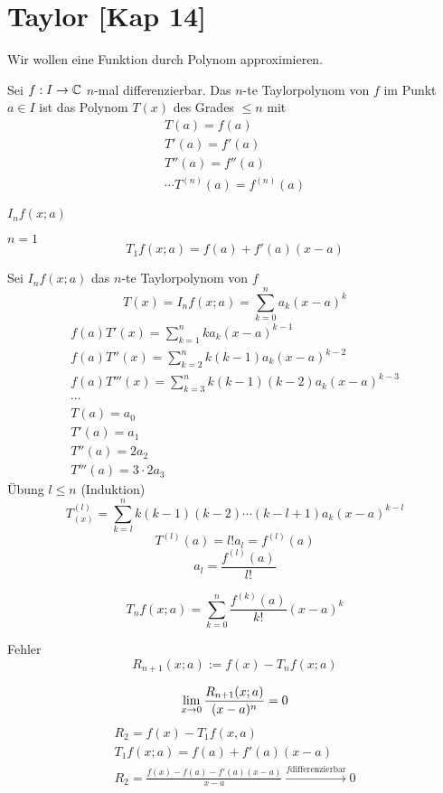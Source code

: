 \section{Taylor [Kap 14]}
Wir wollen eine Funktion durch Polynom approximieren.
\begin{Def}
  Sei $f:I\to\mathbb{C}$ $n$-mal differenzierbar. Das $n$-te Taylorpolynom von $f$ im Punkt $a\in I$ ist das Polynom $T(x)$ des Grades $\leq n$ mit
  \begin{gather*}
    T(a)=f(a)\\
    T'(a)=f'(a)\\
    T''(a)=f''(a)\\
    \cdots
    T^{(n)}(a)=f^{(n)}(a)
  \end{gather*}
\end{Def}
\begin{Not}
  $I_n f(x;a)$
\end{Not}
\begin{Bsp}{$n=1$}
  \[T_1 f(x;a)=f(a)+f'(a)(x-a)\]
\end{Bsp}
\begin{Bem}
  Sei $I_n f(x;a)$ das $n$-te Taylorpolynom von $f$
  \[T(x)=I_n f(x;a)=\sum^n_{k=0}a_k(x-a)^k\]
  \begin{gather*}
    f(a)T'(x)=\sum^n_{k=1} k a_k(x-a)^{k-1}\\
    f(a)T''(x)=\sum^n_{k=2} k(k-1) a_k(x-a)^{k-2}\\
    f(a)T'''(x)=\sum^n_{k=3} k(k-1)(k-2) a_k(x-a)^{k-3}\\
    \cdots\\
    T(a)=a_0\\
    T'(a)=a_1\\
    T''(a)=2a_2\\
    T'''(a)=3\cdot 2a_3
  \end{gather*}
  Übung $l\leq n$ (Induktion)
  \[T^{(l)}_{(x)}=\sum^n_{k=l}k(k-1)(k-2)\cdots(k-l+1)a_k(x-a)^{k-l}\]
  \[T^{(l)}(a)=l!a_l=f^{(l)}(a)\]
  \[a_l=\frac{f^{(l)}(a)}{l!}\]
\end{Bem}
\begin{Eig}
  \[T_nf(x;a)=\sum^n_{k=0}\frac{f^{(k)}(a)}{k!}(x-a)^k\]
\end{Eig}
\begin{Def}{Fehler}
  \[R_{n+1}(x;a):=f(x)-T_nf(x;a)\]  
\end{Def}
\begin{Lem}
  \[\displaystyle\lim_{x\rightarrow0}\frac{R_{n+1}(x;a)}{(x-a)^n}=0\]
  \begin{gather*}
    R_2=f(x)-T_1 f(x,a)\\
    T_1f(x;a)=f(a)+f'(a)(x-a)\\
    R_2= \frac{f(x)-f(a)-f'(a)(x-a)}{x-a}\xrightarrow{f\text{differenzierbar}} 0
  \end{gather*}
\end{Lem}
